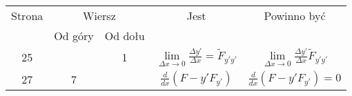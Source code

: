 \documentclass[a4paper,11pt]{article}
\begin{document}
\begin{center}

  \begin{tabular}{|c|c|c|c|c|}
    \hline
    Strona & \multicolumn{2}{c|}{Wiersz} & Jest
                              & Powinno być \\ \cline{2-3}
    & Od góry & Od dołu & & \\
    \hline
    25  & &  1 & $\lim\limits_{ \Delta x \to 0 }
                 \frac{ \Delta y' }{ \Delta x } = \tilde{ F }_{ y' y' }$
           & $\lim\limits_{ \Delta x \to 0 }
             \frac{ \Delta y' }{ \Delta x } \tilde{ F }_{ y' y' }$ \\
    27  &  7 & & $\frac{ d }{ dx }( F - y' F_{ y' } )$
           & $\frac{ d }{ dx }( F - y' F_{ y' } ) = 0$ \\
    \hline
  \end{tabular}

\end{center}

\vspace{\spaceTwo}


















\end{document}
